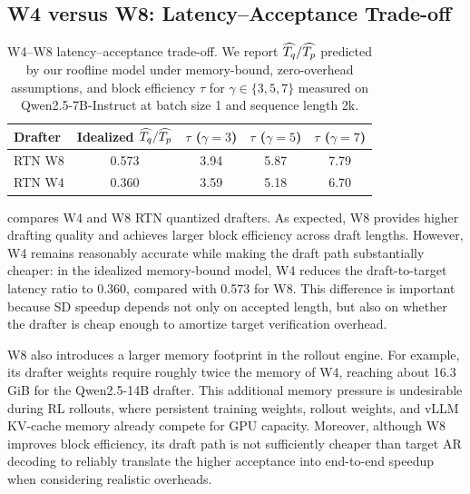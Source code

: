 \subsection{W4 versus W8: Latency--Acceptance Trade-off}
\label{app:w4_vs_w8}

\begin{table}[t]
\centering
\small
\setlength{\tabcolsep}{6pt}
\renewcommand{\arraystretch}{1.10}
\caption{
W4--W8 latency--acceptance trade-off.
We report $\widehat{T_q}/\widehat{T_p}$ predicted by our roofline model under memory-bound, zero-overhead assumptions, and block efficiency $\tau$ for $\gamma \in \{3,5,7\}$ measured on Qwen2.5-7B-Instruct at batch size 1 and sequence length 2k.
}
\label{tab:w4_vs_w8}
\vspace{1mm}
\begin{tabular}{lcccc}
\toprule
\textbf{Drafter}
&
\makecell{\textbf{Idealized}\\$\widehat{T_q}/\widehat{T_p}$}
&
\makecell{\boldmath$\tau$\\\textbf{($\gamma=3$)}}
&
\makecell{\boldmath$\tau$\\\textbf{($\gamma=5$)}}
&
\makecell{\boldmath$\tau$\\\textbf{($\gamma=7$)}} \\
\midrule
RTN W8 & 0.573 & 3.94 & 5.87 & 7.79 \\
RTN W4 & 0.360 & 3.59 & 5.18 & 6.70 \\
\bottomrule
\end{tabular}
\end{table}

 compares W4 and W8 RTN quantized drafters.
As expected, W8 provides higher drafting quality and achieves larger block efficiency across draft lengths.
However, W4 remains reasonably accurate while making the draft path substantially cheaper: in the idealized memory-bound model, W4 reduces the draft-to-target latency ratio to 0.360, compared with 0.573 for W8.
This difference is important because SD speedup depends not only on accepted length, but also on whether the drafter is cheap enough to amortize target verification overhead.

W8 also introduces a larger memory footprint in the rollout engine.
For example, its drafter weights require roughly twice the memory of W4, reaching about 16.3\,GiB for the Qwen2.5-14B drafter.
This additional memory pressure is undesirable during RL rollouts, where persistent training weights, rollout weights, and vLLM KV-cache memory already compete for GPU capacity.
Moreover, although W8 improves block efficiency, its draft path is not sufficiently cheaper than target AR decoding to reliably translate the higher acceptance into end-to-end speedup when considering realistic overheads.

